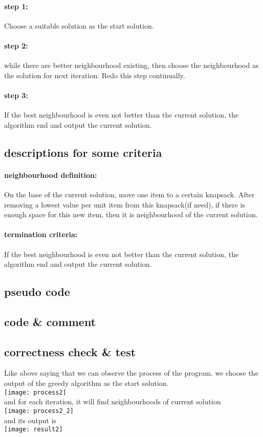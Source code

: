 \documentclass{article}
\begin{document}
\paragraph{step 1:} Choose a suitable solution as the start solution.
\paragraph{step 2:} while there are better neighbourhood existing, then choose the neighbourhood as the solution for next iteration. Redo this step continually.
\paragraph{step 3:} If the best neighbourhood is even not better than the current solution, the algorithm end and output the current solution.
\subsection{descriptions for some criteria}
\paragraph{neighbourhood definition:}On the base of the current solution, move one item to a certain knapsack. After removing a lowest value per unit item from this knapsack(if need), if there is enough space for this new item, then it is neighbourhood of the current solution.
\paragraph{termination criteria:}If the best neighbourhood is even not better than the current solution, the algorithm end and output the current solution.
\subsection{pseudo code}

\subsection{code \& comment}

\subsection{correctness check \& test}
Like above saying that we can observe the process of the program.
we choose the output of the greedy algorithm as the start solution.\\
\texttt{[image: process2]}\\
and for each iteration, it will find neighbourhoods of current solution\\
\texttt{[image: process2\_2]}\\
and its output is\\
\texttt{[image: result2]}\\
\end{document}
